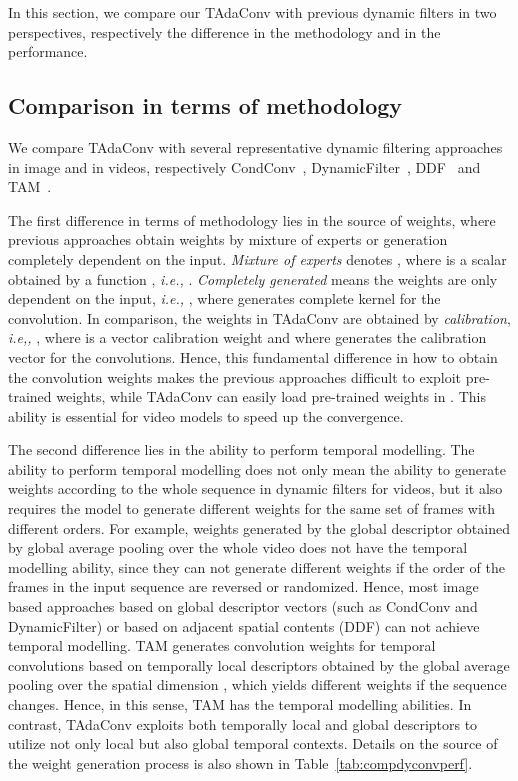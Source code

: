 \documentclass[10pt,journal,compsoc]{IEEEtran}
\begin{document}
In this section, we compare our TAdaConv with previous dynamic filters in two perspectives, respectively the difference in the methodology and in the performance.
\subsection{Comparison in terms of methodology}
We compare TAdaConv with several representative dynamic filtering approaches in image and in videos, respectively CondConv~\cite{condconv}, DynamicFilter~\cite{dynamicfilter}, DDF~\cite{ddf} and TAM~\cite{tam}.

The first difference in terms of methodology lies in the source of weights, where previous approaches obtain weights by mixture of experts or generation completely dependent on the input.
\textit{Mixture of experts} denotes , where  is a scalar obtained by a function , \textit{i.e.,} .
\textit{Completely generated} means the weights are only dependent on the input, \textit{i.e.,} , where  generates complete kernel for the convolution.
In comparison, the weights in TAdaConv are obtained by \textit{calibration}, \textit{i.e,,} , where  is a vector calibration weight and  where  generates the calibration vector for the convolutions.
Hence, this fundamental difference in how to obtain the convolution weights makes the previous approaches difficult to exploit pre-trained weights, while TAdaConv can easily load pre-trained weights in .
This ability is essential for video models to speed up the convergence.

The second difference lies in the ability to perform temporal modelling. The ability to perform temporal modelling does not only mean the ability to generate weights according to the whole sequence in dynamic filters for videos, but it also requires the model to generate different weights for the same set of frames with different orders.
For example, weights generated by the global descriptor obtained by global average pooling over the whole video  does not have the temporal modelling ability, since they can not generate different weights if the order of the frames in the input sequence are reversed or randomized. Hence, most image based approaches based on global descriptor vectors (such as CondConv and DynamicFilter) or based on adjacent spatial contents (DDF) can not achieve temporal modelling. TAM generates convolution weights for temporal convolutions based on temporally local descriptors obtained by the global average pooling over the spatial dimension , which yields different weights if the sequence changes. Hence, in this sense, TAM has the temporal modelling abilities. In contrast, TAdaConv exploits both temporally local and global descriptors to utilize not only local but also global temporal contexts. Details on the source of the weight generation process is also shown in Table~\ref{tab:compdyconvperf}.
\end{document}
